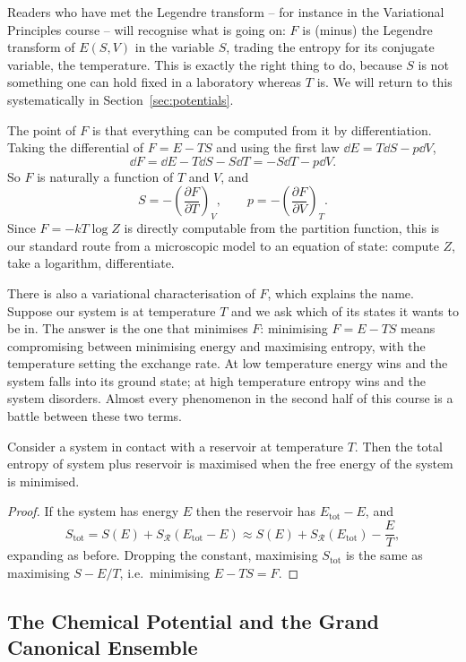 Readers who have met the Legendre transform -- for instance in the Variational Principles course -- will recognise what is going on: $F$ is (minus) the Legendre transform of $E(S,V)$ in the variable $S$, trading the entropy for its conjugate variable, the temperature. This is exactly the right thing to do, because $S$ is not something one can hold fixed in a laboratory whereas $T$ is. We will return to this systematically in Section~\ref{sec:potentials}.

The point of $F$ is that everything can be computed from it by differentiation. Taking the differential of $F = E - TS$ and using the first law $\dd E = T\dd S - p \dd V$,
$$
\dd F = \dd E - T\dd S - S \dd T = -S\dd T - p\dd V.
$$
So $F$ is naturally a function of $T$ and $V$, and
$$
S = -\left(\frac{\partial F}{\partial T}\right)_V, \qquad p = -\left(\frac{\partial F}{\partial V}\right)_T.
$$
Since $F = -kT\log Z$ is directly computable from the partition function, this is our standard route from a microscopic model to an equation of state: compute $Z$, take a logarithm, differentiate.

There is also a variational characterisation of $F$, which explains the name. Suppose our system is at temperature $T$ and we ask which of its states it wants to be in. The answer is the one that minimises $F$: minimising $F = E - TS$ means compromising between minimising energy and maximising entropy, with the temperature setting the exchange rate. At low temperature energy wins and the system falls into its ground state; at high temperature entropy wins and the system disorders. Almost every phenomenon in the second half of this course is a battle between these two terms.

\begin{proposition}
	Consider a system in contact with a reservoir at temperature $T$. Then the total entropy of system plus reservoir is maximised when the free energy of the system is minimised.
\end{proposition}
\begin{proof}
	If the system has energy $E$ then the reservoir has $E_{\mathrm{tot}} - E$, and
	$$
	S_{\mathrm{tot}} = S(E) + S_{\mathcal R}(E_{\mathrm{tot}} - E) \approx S(E) + S_{\mathcal R}(E_{\mathrm{tot}}) - \frac{E}{T},
	$$
	expanding as before. Dropping the constant, maximising $S_{\mathrm{tot}}$ is the same as maximising $S - E/T$, i.e.\ minimising $E - TS = F$.
\end{proof}

\subsection{The Chemical Potential and the Grand Canonical Ensemble}

